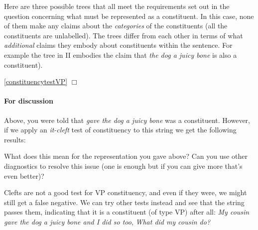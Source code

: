 \documentclass{article}
\begin{document}
\begin{answer}
{
Here are three possible trees that all meet the requirements set out in the question concerning what must be represented as a constituent. In this case, none of them make any claims about the \emph{categories} of the constituents (all the constituents are unlabelled). The trees differ from each other in terms of what \emph{additional} claims they embody about constituents within the sentence. For example the tree in II embodies the claim that \emph{the dog a juicy bone} is also a constituent).\\
\begin{exe}
\end{exe}
}
\end{answer}

\hfill{}\ref{constituencytestVP} $\Box$

\paragraph{For discussion} Above, you were told that \emph{gave the dog a juicy bone} was a constituent.
However, if we apply an \emph{it-cleft} test of constituency to this string we get the following results:
\begin{exe}
\end{exe}
What does this mean for the representation you gave above?
Can you use other diagnostics to resolve this issue (one is enough but if you can give more that's even better)?

\begin{answer}
{
Clefts are not a good test for VP constituency, and even if they were, we might still get a false negative. We can try other tests instead and see that the string passes them, indicating that it is a constituent (of type VP) after all: \emph{My cousin gave the dog a juicy bone and I did so too}, \emph{What did my cousin do?}
}
\end{answer}
\end{document}
